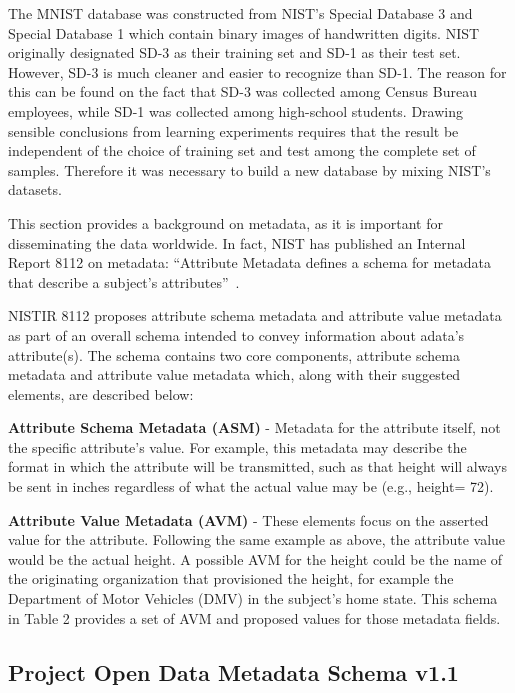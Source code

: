 


The MNIST database was constructed from NIST's Special Database 3 and Special Database 1 which contain binary images of handwritten digits. NIST originally designated SD-3 as their training set and SD-1 as their test set. However, SD-3 is much cleaner and easier to recognize than SD-1. The reason for this can be found on the fact that SD-3 was collected among Census Bureau employees, while SD-1 was collected among high-school students. Drawing sensible conclusions from learning experiments requires that the result be independent of the choice of training set and test among the complete set of samples. Therefore it was necessary to build a new database by mixing NIST's datasets.

This section provides a background on metadata, as it is important for disseminating the data worldwide. In fact, NIST has published an Internal Report 8112 on metadata: ``Attribute Metadata defines a schema for metadata that describe a subject’s attributes''~\cite{nistirmetadata}. 

NISTIR 8112 proposes attribute schema metadata and attribute value metadata as part of an overall schema intended to convey information about adata's attribute(s). The schema contains two core components, attribute schema metadata and attribute value metadata which, along with their suggested elements, are described below:
\begin{description}
\item{\textbf{Attribute Schema Metadata (ASM)}} - Metadata for the attribute itself, not the specific attribute’s value. For example, this metadata may describe the format in which the attribute will be transmitted, such as that height will always be sent in inches regardless of what the actual value may be (e.g., height= 72).

\item{\textbf{Attribute Value Metadata (AVM)}} - These elements focus on the asserted value for the attribute. Following the same example as above, the attribute value would be the actual height. A possible AVM for the height could be the name of the originating organization that provisioned the height, for example the Department of Motor Vehicles (DMV) in the subject’s home state. This schema in Table 2 provides a set of AVM and proposed values for those metadata fields.
\end{description}

\subsection{Project Open Data Metadata Schema v1.1}



